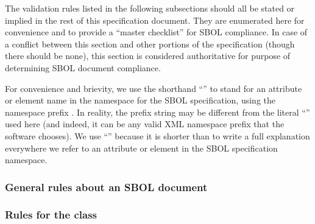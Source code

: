 The validation rules listed in the following subsections should all be
stated or implied in the rest of this specification document.  They
are enumerated here for convenience and to provide a ``master
checklist'' for SBOL compliance.  In case of a conflict between this
section and other portions of the specification (though there should
be none), this section is considered authoritative for purpose of
determining SBOL document compliance.

For \notice convenience and brievity, we use the shorthand
``'' to stand for an attribute or element name 
in the namespace for the SBOL specification, using
the namespace prefix .  In reality, the prefix string may be different from the literal ``'' used here (and indeed, it can be any valid XML namespace prefix that the software
chooses).  We use ``'' because it is shorter than to
write a full explanation everywhere we refer to an attribute or element
in the SBOL specification namespace.

\subsubsection*{General rules about an SBOL document}
\setcounter{sbolCtr}{10101} 





\subsubsection*{Rules for the  class} 
\setcounter{sbolCtr}{10201}

